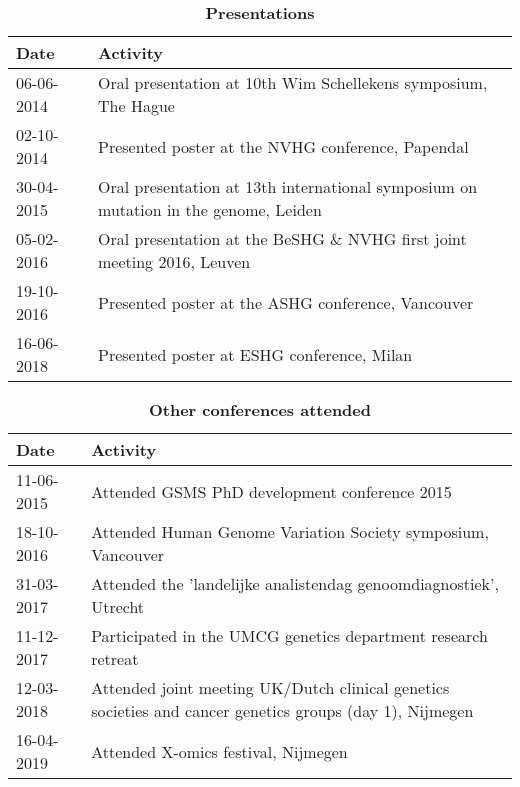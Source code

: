 \begin{appendices}
\begin{table}
	\caption*{\textbf{Presentations}}
	\footnotesize
	\begin{tabulary}{\linewidth}{LL}
		Date & Activity \\
		\hline
			\rule{0pt}{2.6ex}\mbox{06-06-2014 } & Oral presentation at 10th Wim Schellekens symposium, The Hague \\
			\rule{0pt}{2.6ex}\mbox{02-10-2014 } & Presented poster at the NVHG conference, Papendal \\
			\rule{0pt}{2.6ex}\mbox{30-04-2015 } & Oral presentation at 13th international symposium on mutation in the genome, Leiden \\
			\rule{0pt}{2.6ex}\mbox{05-02-2016 } & Oral presentation at the BeSHG \& NVHG first joint meeting 2016, Leuven \\
			\rule{0pt}{2.6ex}\mbox{19-10-2016 } & Presented poster at the ASHG conference, Vancouver\\
			\rule{0pt}{2.6ex}\mbox{16-06-2018 } & Presented poster at ESHG conference, Milan \\
			\hline
\end{tabulary}
\label{table:appendix_activities_2}
\end{table}

\clearpage



\begin{table}
	\caption*{\textbf{Other conferences attended}}
	\footnotesize
	\begin{tabulary}{\linewidth}{LL}
		Date & Activity \\
		\hline
		\rule{0pt}{2.6ex}\mbox{11-06-2015 } & Attended GSMS PhD development conference 2015 \\
		\rule{0pt}{2.6ex}\mbox{18-10-2016 } & Attended Human Genome Variation Society symposium, Vancouver \\
		\rule{0pt}{2.6ex}\mbox{31-03-2017 } & Attended the 'landelijke analistendag genoomdiagnostiek', Utrecht \\
		\rule{0pt}{2.6ex}\mbox{11-12-2017 } & Participated in the UMCG genetics department research retreat \\
		\rule{0pt}{2.6ex}\mbox{12-03-2018 } & Attended joint meeting UK/Dutch clinical genetics societies and cancer genetics groups (day 1), Nijmegen \\
		\rule{0pt}{2.6ex}\mbox{16-04-2019 } & Attended X-omics festival, Nijmegen \\
		\hline
	\end{tabulary}
	\label{table:appendix_activities_3}
\end{table}




\end{appendices}
